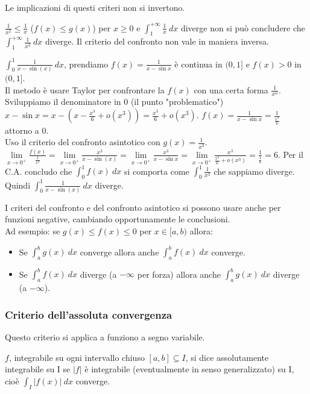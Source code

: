 \begin{observation}
Le implicazioni di questi criteri non si invertono.
\end{observation}

\begin{example}
$\frac{1}{x^2} \leq \frac{1}{x}$ ($f(x) \leq g(x)$) per $x\geq 0$ e $\int_1^{+\infty}\frac{1}{x}\:dx$ diverge non si può concludere che $\int_1^{+\infty}\frac{1}{x^2}\:dx$ diverge. Il criterio del confronto non vale in maniera inversa.
\end{example}

\begin{example}
$\int_0^1 \frac{1}{x-\sin(x)}\:dx$, prendiamo $f(x) = \frac{1}{x-\sin{x}}$ è continua in $(0,1]$ e $f(x) > 0$ in $(0,1]$.\\
Il metodo è usare Taylor per confrontare la $f(x)$ con una certa forma $\frac{1}{x^{\alpha}}$. Sviluppiamo il denominatore in 0 (il punto "problematico")\\
$x-\sin{x} = x - (x-\frac{x^3}{6} + o(x^3)) = \frac{x^3}{6} + o(x^3)$. $f(x) = \frac{1}{x-\sin{x}} = \frac{1}{\frac{x^3}{6}}$ attorno a 0.\\
Uso il criterio del confronto asintotico con $g(x) = \frac{1}{x^3}$. $\lim\limits_{x\to 0^+}\frac{f(x)}{\frac{1}{x^3}} = \lim\limits_{x\to 0^+}\frac{x^3}{x-\sin(x)} = \lim\limits_{x\to 0^+} \frac{x^3}{x-\sin{x}} = \lim\limits_{x\to 0^+}\frac{x^3}{\frac{x^3}{6} + o(x^3)} = \frac{1}{\frac{1}{6}} = 6$. Per il C.A. concludo che $\int_0^1 f(x)\:dx$ si comporta come $\int_0^1 \frac{1}{x^3}$ che sappiamo diverge. Quindi $\int_0^1 \frac{1}{x-\sin(x)}\:dx$ diverge.
\end{example}

\begin{observation}
I criteri del confronto e del confronto asintotico si possono usare anche per funzioni negative, cambiando opportunamente le conclusioni.\\
Ad esempio: se $g(x) \leq f(x) \leq 0$ per $x\in [a,b)$ allora:
\begin{itemize}
    \item Se $\int_a^b g(x)\:dx$ converge allora anche $\int_a^b f(x)\:dx$ converge.
    \item Se $\int_a^b f(x)\:dx$ diverge (a $-\infty$ per forza) allora anche $\int_a^b g(x)\:dx$ diverge (a $-\infty$).
\end{itemize}
\end{observation}

\subsubsection{Criterio dell'assoluta convergenza}
Questo criterio si applica a funziono a segno variabile.
\begin{definition}
$f$, integrabile su ogni intervallo chiuso $[a,b]\subseteq I$, si dice assolutamente integrabile su I se $|f|$ è integrabile (eventualmente in senso generalizzato) su I, cioè $\int_I |f(x)|\:dx$ converge.
\end{definition}

